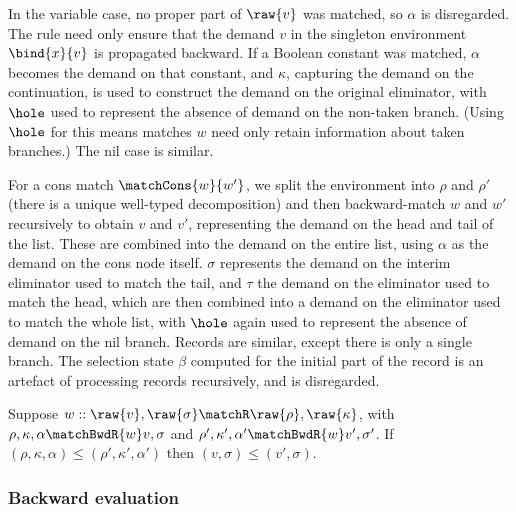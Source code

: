 

In the variable case, no proper part of $\raw{v}$ was matched, so $\alpha$ is disregarded. The rule need only ensure that the demand $v$ in the singleton environment $\bind{x}{v}$ is propagated backward. If a Boolean constant was matched, $\alpha$ becomes the demand on that constant, and $\kappa$, capturing the demand on the continuation, is used to construct the demand on the original eliminator, with $\hole$ used to represent the absence of demand on the non-taken branch. (Using $\hole$ for this means matches $w$ need only retain information about taken branches.) The nil case is similar.

For a cons match $\matchCons{w}{w'}$, we split the environment into $\rho$ and $\rho'$ (there is a unique well-typed decomposition) and then backward-match $w$ and $w'$ recursively to obtain $v$ and $v'$, representing the demand on the head and tail of the list. These are combined into the demand on the entire list, using $\alpha$ as the demand on the cons node itself. $\sigma$ represents the demand on the interim eliminator used to match the tail, and $\tau$ the demand on the eliminator used to match the head, which are then combined into a demand on the eliminator used to match the whole list, with $\hole$ again used to represent the absence of demand on the nil branch. Records are similar, except there is only a single branch. The selection state $\beta$ computed for the initial part of the record is an artefact of processing records recursively, and is disregarded.

\begin{lemma}
   Suppose $w :: \raw{v}, \raw{\sigma} \matchR \raw{\rho}, \raw{\kappa}$, with $\rho, \kappa, \alpha \matchBwdR{w} v, \sigma$ and $\rho', \kappa', \alpha' \matchBwdR{w} v', \sigma'$. If $(\rho, \kappa, \alpha) \leq (\rho', \kappa', \alpha')$ then $(v, \sigma) \leq (v', \sigma)$.
\end{lemma}

\subsubsection{Backward evaluation}
\label{sec:data-dependencies:analyses:bwd:eval}

